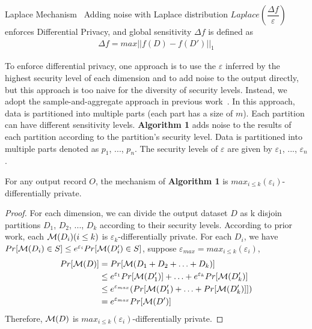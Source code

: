 

\begin{theorem}{Laplace Mechanism~\cite{Dwork2006Differential}}
  Adding noise with Laplace distribution $Laplace(\dfrac{\Delta 
f}{\varepsilon})$ enforces
  Differential Privacy, and global sensitivity $\Delta f$ is defined as
  \vspace{-.1in}
  \begin{align}
    \Delta f = max || f(D) - f(D') ||_1
  \end{align}
\end{theorem}

To enforce differential privacy, one approach is to use the $\varepsilon$ 
inferred by the highest security level of each dimension and to add noise to 
the output directly, but this approach is too naive for the diversity of 
security levels. Instead, we adopt the sample-and-aggregate approach in 
previous work~\cite{differentialdp:stoc11}. In this approach, data is 
partitioned into multiple parts (each part has a size of $m$). Each partition 
can have different sensitivity levels. \textbf{Algorithm 1} adds noise to the 
results of each partition according to the partition's security level. Data 
is partitioned into multiple parts denoted as $p_1$, ..., $p_n$.
The security levels of $\varepsilon$ are given by $\varepsilon_1$,
..., $\varepsilon_n$.

\begin{theorem}
  For any output record $O$, the
  mechanism of \textbf{Algorithm 1} is $max_{i \le 
k}(\varepsilon_i)$-differentially private.
\end{theorem}
\begin{proof}
  For each dimension, we can divide the output dataset $D$ as k disjoin partitions 
$D_1$, $D_2$,
  ..., $D_k$ according to their security levels. According to 
prior work\cite{pointestimation:smith08},
  each ${\cal M}(D_i)(i \le k)$ is $\varepsilon_k$-differentially private.
  For each $D_i$, we have $Pr[{\cal M}(D_i) \in S] \le e^{\varepsilon_i}Pr[{\cal M}(D'_i) \in 
S]$, suppose $\varepsilon_{max} = max_{i \le k}(\varepsilon_i)$, \\
  \vspace{-0.1in}
  \begin{equation} \label{eq1}
  \begin{split}
  Pr[{\cal M}(D)] & = Pr[{\cal M}(D_1 + D_2 + \ldots + D_k)] \\
   & \le e^{\varepsilon_1}Pr[{\cal M}(D'_1)] + \ldots + e^{\varepsilon_k}Pr[{\cal M}(D'_k)] \\
   & \le  e^{\varepsilon_{max}}(Pr[{\cal M}(D'_1) + \ldots + Pr[{\cal M}(D'_k)]]) \\
   & = e^{\varepsilon_{max}}Pr[{\cal M}(D')]
  \end{split}
  \end{equation}
  Therefore, ${\cal M}(D)$ is $max_{i \le k}(\varepsilon_i)$-differentially private.
\end{proof}

